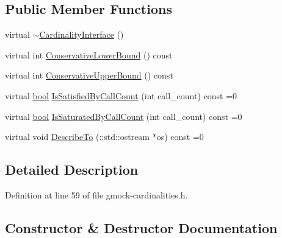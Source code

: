 \subsection*{Public Member Functions}
\begin{DoxyCompactItemize}
\item 
virtual \hyperlink{classtesting_1_1CardinalityInterface_a8d9f9fcf50e5517a7c28a97c1d0737d8}{$\sim$\+Cardinality\+Interface} ()
\item 
virtual int \hyperlink{classtesting_1_1CardinalityInterface_a1aff90c45ff45658fee99d15fd0a6f89}{Conservative\+Lower\+Bound} () const
\item 
virtual int \hyperlink{classtesting_1_1CardinalityInterface_ac741b28605377d603623dddf4b1c8d33}{Conservative\+Upper\+Bound} () const
\item 
virtual \hyperlink{classbool}{bool} \hyperlink{classtesting_1_1CardinalityInterface_af89684f4ea6d9de331abf7958754d8f1}{Is\+Satisfied\+By\+Call\+Count} (int call\+\_\+count) const =0
\item 
virtual \hyperlink{classbool}{bool} \hyperlink{classtesting_1_1CardinalityInterface_a42508cff9627de2e6f9c1ec33a7d8bf2}{Is\+Saturated\+By\+Call\+Count} (int call\+\_\+count) const =0
\item 
virtual void \hyperlink{classtesting_1_1CardinalityInterface_a8a93e3bbf24d14fe21186802ecef0929}{Describe\+To} (\+::std\+::ostream $\ast$os) const =0
\end{DoxyCompactItemize}


\subsection{Detailed Description}


Definition at line 59 of file gmock-\/cardinalities.\+h.



\subsection{Constructor \& Destructor Documentation}
\mbox{\label{classtesting_1_1CardinalityInterface_a8d9f9fcf50e5517a7c28a97c1d0737d8}} 
